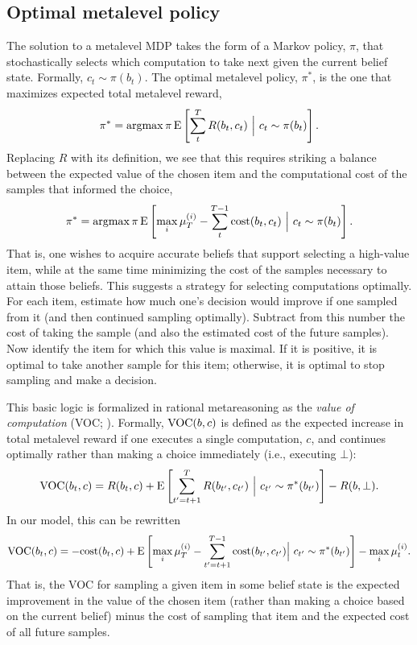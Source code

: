 \subsection{Optimal metalevel policy}


The solution to a metalevel MDP takes the form of a Markov policy, $\pi$, that stochastically selects which computation to take next given the current belief state. Formally, $c_t \sim \pi(b_t)$. The optimal metalevel policy, $\pi^*$, is the one that maximizes expected total metalevel reward,
\begin{equation*}
  \pi^* = \operatorname*{argmax}{\pi} \operatorname*{E} \left[ \sum_t^T R(b_t, c_t) \ \Big\vert\ c_t \sim \pi(b_t) \right].
\end{equation*}
Replacing $R$ with its definition, we see that this requires striking a balance between the expected value of the chosen item and the computational cost of the samples that informed the choice,
\begin{equation*}
  \pi^* = \operatorname*{argmax}{\pi} \operatorname*{E} \left[
     \max_i \mu_T^{(i)} - \sum_t^{T-1} \text{cost}(b_t, c_t)
   \ \Big\vert\ c_t \sim \pi(b_t) \right].
\end{equation*}
That is, one wishes to acquire accurate beliefs that support selecting a high-value item, while at the same time minimizing the cost of the samples necessary to attain those beliefs. This suggests a strategy for selecting computations optimally. For each item, estimate how much one's decision would improve if one sampled from it (and then continued sampling optimally). Subtract from this number the cost of taking the sample (and also the estimated cost of the future samples). Now identify the item for which this value is maximal. If it is positive, it is optimal to take another sample for this item; otherwise, it is optimal to stop sampling and make a decision.

This basic logic is formalized in rational metareasoning as the \textit{value of computation} (VOC; \citealp{russell1991principles}). Formally, $\text{VOC}(b, c)$ is defined as the expected increase in total metalevel reward if one executes a single computation, $c$, and continues optimally rather than making a choice immediately (i.e., executing $\bot$):
$$
\text{VOC}(b_t, c) = R(b_t, c) + \operatorname*{E} \left[
  \sum_{t'=t+1}^T R(b_{t'}, c_{t'})\ \Big\vert\ c_{t'} \sim \pi^*(b_{t'}) 
\right] - R(b, \bot).
$$
In our model, this can be rewritten
$$
\text{VOC}(b_t, c) = -\text{cost}(b_t, c) + \operatorname*{E} \left[ 
  \max_i \mu_T^{(i)} - \sum_{t'=t+1}^{T-1} \text{cost}(b_{t'}, c_{t'})
  \Big\vert\ c_{t'} \sim \pi^*(b_{t'})
\right] -  \max_i \mu_t^{(i)}.
$$
That is, the VOC for sampling a given item in some belief state is the expected improvement in the value of the chosen item (rather than making a choice based on the current belief) minus the cost of sampling that item and the expected cost of all future samples.

